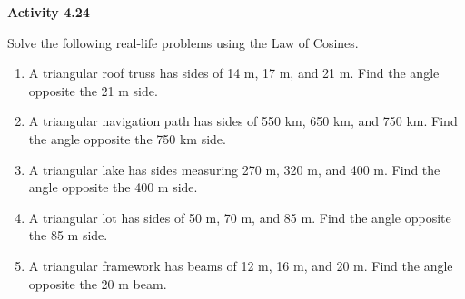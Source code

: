 \vspace{0.3ex}
\noindent\textbf{Activity 4.24}

\vspace{0.2ex}

Solve the following real-life problems using the Law of Cosines.

\begin{enumerate}
    \item A triangular roof truss has sides of 14 m, 17 m, and 21 m. Find the angle opposite the 21 m side.
    \item A triangular navigation path has sides of 550 km, 650 km, and 750 km. Find the angle opposite the 750 km side.
    \item A triangular lake has sides measuring 270 m, 320 m, and 400 m. Find the angle opposite the 400 m side.
    \item A triangular lot has sides of 50 m, 70 m, and 85 m. Find the angle opposite the 85 m side.
    \item A triangular framework has beams of 12 m, 16 m, and 20 m. Find the angle opposite the 20 m beam.
\end{enumerate}
